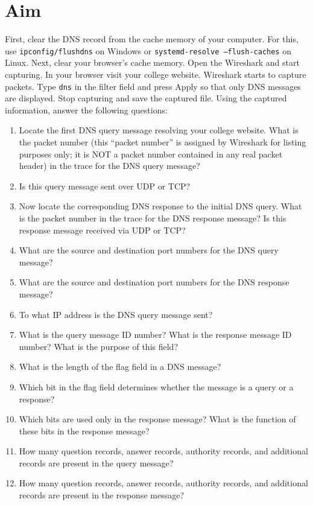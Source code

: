 \documentclass[12pt, a4paper]{report}
\begin{document}
\section*{Aim}
First, clear the DNS record from the cache memory of your computer. For this, use \texttt{ipconfig/flushdns} on Windows or \texttt{systemd-resolve --flush-caches} on Linux. Next, clear your browser's cache memory. Open the Wireshark and start capturing. In your browser visit your college website. Wireshark starts to capture packets. Type \texttt{dns} in the filter field and press Apply so that only DNS messages are displayed. Stop capturing and save the captured file. Using the captured information, answer the following questions:
\begin{enumerate}
	\itemsep 0em
	\item[(a)] Locate the first DNS query message resolving your college website. What is the packet number (this ``packet number'' is assigned by Wireshark for listing purposes only; it is NOT a packet number contained in any real packet header) in the trace for the DNS query message?
	\item[(b)] Is this query message sent over UDP or TCP?
	\item[(c)] Now locate the corresponding DNS response to the initial DNS query. What is the packet number in the trace for the DNS response message? Is this response message received via UDP or TCP?
	\item[(d)] What are the source and destination port numbers for the DNS query message?
	\item[(e)] What are the source and destination port numbers for the DNS response message?
	\item[(f)] To what IP address is the DNS query message sent?
	\item[(g)] What is the query message ID number? What is the response message ID number? What is the purpose of this field?
	\item[(h)] What is the length of the flag field in a DNS message?
	\item[(i)] Which bit in the flag field determines whether the message is a query or a response?
	\item[(j)] Which bits are used only in the response message? What is the function of these bits in the response message?
	\item[(k)] How many question records, answer records, authority records, and additional records are present in the query message?
	\item[(l)] How many question records, answer records, authority records, and additional records are present in the response message?
\end{enumerate}
\end{document}

